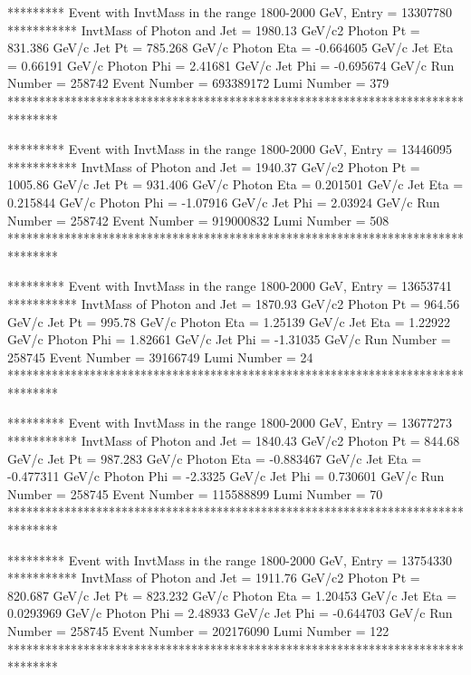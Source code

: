                                                                      
********* Event with InvtMass in the range 1800-2000 GeV, Entry = 13307780 ***********
InvtMass of Photon and Jet = 1980.13 GeV/c2
Photon Pt = 831.386 GeV/c
Jet Pt = 785.268 GeV/c
Photon Eta = -0.664605 GeV/c
Jet Eta = 0.66191 GeV/c
Photon Phi = 2.41681 GeV/c
Jet Phi = -0.695674 GeV/c
Run Number = 258742
Event Number = 693389172
Lumi Number = 379
********************************************************************************
                                                                     
                                                                     
********* Event with InvtMass in the range 1800-2000 GeV, Entry = 13446095 ***********
InvtMass of Photon and Jet = 1940.37 GeV/c2
Photon Pt = 1005.86 GeV/c
Jet Pt = 931.406 GeV/c
Photon Eta = 0.201501 GeV/c
Jet Eta = 0.215844 GeV/c
Photon Phi = -1.07916 GeV/c
Jet Phi = 2.03924 GeV/c
Run Number = 258742
Event Number = 919000832
Lumi Number = 508
********************************************************************************
                                                                     
                                                                     
********* Event with InvtMass in the range 1800-2000 GeV, Entry = 13653741 ***********
InvtMass of Photon and Jet = 1870.93 GeV/c2
Photon Pt = 964.56 GeV/c
Jet Pt = 995.78 GeV/c
Photon Eta = 1.25139 GeV/c
Jet Eta = 1.22922 GeV/c
Photon Phi = 1.82661 GeV/c
Jet Phi = -1.31035 GeV/c
Run Number = 258745
Event Number = 39166749
Lumi Number = 24
********************************************************************************
                                                                     
                                                                     
********* Event with InvtMass in the range 1800-2000 GeV, Entry = 13677273 ***********
InvtMass of Photon and Jet = 1840.43 GeV/c2
Photon Pt = 844.68 GeV/c
Jet Pt = 987.283 GeV/c
Photon Eta = -0.883467 GeV/c
Jet Eta = -0.477311 GeV/c
Photon Phi = -2.3325 GeV/c
Jet Phi = 0.730601 GeV/c
Run Number = 258745
Event Number = 115588899
Lumi Number = 70
********************************************************************************
                                                                     
                                                                     
********* Event with InvtMass in the range 1800-2000 GeV, Entry = 13754330 ***********
InvtMass of Photon and Jet = 1911.76 GeV/c2
Photon Pt = 820.687 GeV/c
Jet Pt = 823.232 GeV/c
Photon Eta = 1.20453 GeV/c
Jet Eta = 0.0293969 GeV/c
Photon Phi = 2.48933 GeV/c
Jet Phi = -0.644703 GeV/c
Run Number = 258745
Event Number = 202176090
Lumi Number = 122
********************************************************************************
                                                                     

